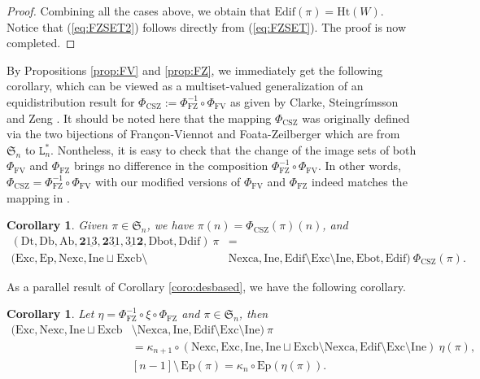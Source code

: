 \documentclass[12pt]{amsart}
\numberwithin{equation}{section}
\theoremstyle{plain}
\newtheorem{corollary}[theorem]{Corollary}
\theoremstyle{definition}
\def\FV{\mathrm{FV}}
\def\FZ{\mathrm{FZ}}
\def\CSZ{\mathrm{CSZ}}
\def\SS{\mathfrak{S}}
\def\Het{\mathrm{Ht}}
\def\Db{\mathrm{Db}}
\def\Ab{\mathrm{Ab}}
\def\Dt{\mathrm{Dt}}
\def\Ddif{\mathrm{Ddif}}
\def\Dbot{\mathrm{Dbot}}
\def\rightascent{{\mathbf{2}\underline{13}}}
\def\leftdescent{\mathrm{\underline{31}}\mathbf{2}}
\def\rightdescent{\mathrm{\mathbf{2}\underline{31}}}
\def\Edif{\mathrm{Edif}}
\def\Excp{\mathrm{Ep}}
\def\Exc{\mathrm{Exc}}
\def\Nexc{\mathrm{Nexc}}
\def\Nexca{\mathrm{Nexca}}
\def\Excb{\mathrm{Excb}}
\def\Ine{\mathrm{Ine}}
\def\Ebot{\mathrm{Ebot}}
\begin{document}
\begin{proof}
Combining all the cases above, we obtain that $\Edif(\pi)=\Het(W)$. Notice that (\ref{eq:FZSET2})  follows directly from (\ref{eq:FZSET}). The proof is now completed.
\end{proof}


By Propositions \ref{prop:FV} and \ref{prop:FZ}, we immediately get the following corollary, which can be viewed as a multiset-valued generalization of an equidistribution result for $\Phi_{\CSZ}:=\Phi_{\FZ}^{-1} \circ \Phi_{\FV}$ as given by Clarke, Steingr\'{i}msson and Zeng \cite{CSZ}. It should be noted here that the mapping $\Phi_{\CSZ}$ was originally defined via the two bijections of Fran\c con-Viennot and Foata-Zeilberger which are from $\SS_n$ to $\mathtt{L}_n^*$. Nontheless, it is easy to check that
the change of the image sets of both $\Phi_{\FV}$ and $\Phi_{\FZ}$ brings no difference in the composition $\Phi_{\FZ}^{-1} \circ \Phi_{\FV}$. In other words, $\Phi_{\CSZ}= \Phi_{\FZ}^{-1} \circ \Phi_{\FV}$ with our modified versions of $\Phi_{\FV}$ and $\Phi_{\FZ}$ indeed matches the mapping in \cite{CSZ}.



\begin{corollary}
Given $\pi \in \SS_n$, we have $\pi(n)=\Phi_{\CSZ}(\pi)(n)$, and
\begin{align*}
  (\Dt,\Db,\Ab,\rightascent, \rightdescent, \leftdescent,\Dbot,\Ddif)\:\pi&= \\[3pt]
(\Exc,\Excp,\Nexc,\Ine \sqcup \Excb \setminus &\Nexca, \Ine, \Edif \setminus \Exc \setminus \Ine,\Ebot,\Edif) \:\Phi_{\CSZ}(\pi).
\end{align*}
\end{corollary}



 
As a parallel result of Corollary \ref{coro:desbased},
we have the following corollary.



\begin{corollary}
Let $\eta=\Phi_{\FZ}^{-1}\circ \xi \circ \Phi_{\FZ}$ and $\pi \in \SS_n$, then
\begin{align*}
  (\Exc,\Nexc,\Ine \sqcup \Excb& \setminus \Nexca ,\Ine,\Edif \setminus \Exc \setminus \Ine) \: \pi \\[4pt]
&=\kappa_{n+1}\circ(\Nexc,\Exc,\Ine,\Ine \sqcup \Excb \setminus \Nexca ,\Edif \setminus \Exc \setminus \Ine) \:\eta(\pi),\\[4pt]
&[n-1] \setminus\,  \Excp(\pi)=  \kappa_n\circ\Excp(\eta(\pi)).
 

\end{align*}
\end{corollary}
\end{document}
